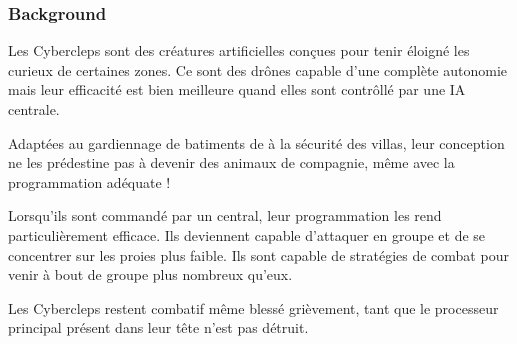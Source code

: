 \subsubsection{Background}
Les Cybercleps sont des créatures artificielles conçues pour tenir éloigné les curieux de certaines zones. Ce sont des drônes capable d’une complète autonomie mais leur efficacité est bien meilleure quand elles sont contrôllé par une IA centrale. 

Adaptées au gardiennage de batiments de à la sécurité des villas, leur conception ne les prédestine pas à devenir des animaux de compagnie, même avec la programmation adéquate !

Lorsqu’ils sont commandé par un central, leur programmation les rend particulièrement efficace. Ils deviennent capable d’attaquer en groupe et de se concentrer sur les proies plus faible. Ils sont capable de stratégies de combat pour venir à bout de groupe plus nombreux qu’eux.

Les Cybercleps restent combatif même blessé grièvement, tant que le processeur principal présent dans leur tête n’est pas détruit.